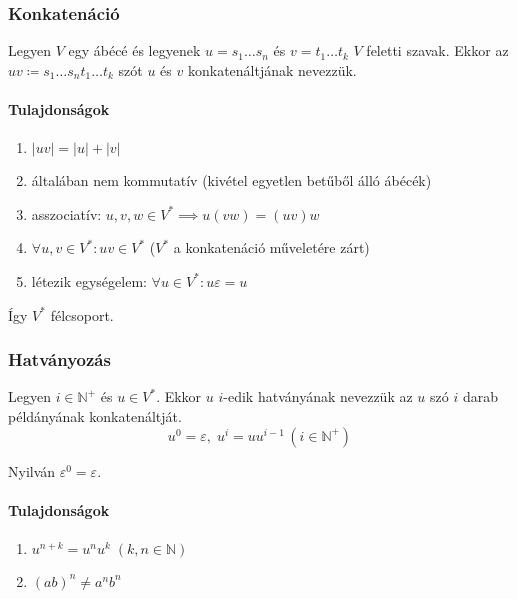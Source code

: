\subsubsection{Konkatenáció}
\begin{definition*}
	Legyen $V$ egy ábécé és legyenek $ u = s_1 \dots s_n $ és $ v = t_1 \dots t_k $ $V$ feletti szavak. Ekkor az $uv \coloneq s_1 \dots s_n t_1 \dots t_k $ szót $u$ és $v$ konkatenáltjának nevezzük.
\end{definition*}
\paragraph{Tulajdonságok}
\begin{enumerate}
	\item{$ \left| uv \right| = \left| u \right| + \left| v \right| $}
	\item általában nem kommutatív (kivétel egyetlen betűből álló ábécék)
	\item asszociatív: $ u,v,w \in V^* \implies u(vw) = (uv)w $
	\item $ \forall u,v \in V^*: uv \in V^* $ ($ V^* $ a konkatenáció műveletére zárt)
	\item létezik egységelem: $ \forall u \in V^*: u\varepsilon = u $
\end{enumerate}
Így $V^*$ félcsoport.

\newpage
\subsubsection{Hatványozás}
\begin{definition*}
	Legyen $ i \in \mathbb{N}^+ $ és $ u \in V^* $. Ekkor $u$ $i$-edik hatványának nevezzük az $u$ szó $i$ darab példányának konkatenáltját.
	\[
	u^0 = \varepsilon, \; u^i = uu^{i-1} \, (i \in \mathbb{N}^+)
	\]
\end{definition*}

\begin{remark}
	Nyilván $\varepsilon^0 = \varepsilon$.
\end{remark}
\paragraph{Tulajdonságok}
\begin{enumerate}
	\item{$u^{n+k} = u^n u^k \; \left( k,n \in \mathbb{N} \right)  $}
	\item{$ (ab)^n \ne a^nb^n $}
\end{enumerate}

